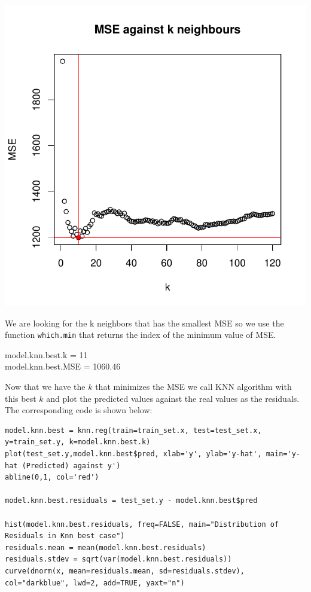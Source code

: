 \documentclass[]{report}
\begin{document}
\begin{center}	
	\includegraphics[width=0.9\linewidth]{Figures/knn_test.pdf}
	\label{fig:knn_train}
\end{center}

We are looking for the k neighbors that has the smallest MSE so we use the function \texttt{which.min} that returns the index of the minimum value of MSE.\\

\begin{center} 
	model.knn.best.k   = 11 \\
	model.knn.best.MSE = 1060.46
\end{center}

Now that we have the $k$ that minimizes the MSE we call KNN algorithm with this best $k$ and plot the predicted values against the real values as the residuals. The corresponding code is shown below:

\begin{lstlisting}
model.knn.best = knn.reg(train=train_set.x, test=test_set.x, y=train_set.y, k=model.knn.best.k)
plot(test_set.y,model.knn.best$pred, xlab='y', ylab='y-hat', main='y-hat (Predicted) against y')
abline(0,1, col='red')

model.knn.best.residuals = test_set.y - model.knn.best$pred

hist(model.knn.best.residuals, freq=FALSE, main="Distribution of Residuals in Knn best case")
residuals.mean = mean(model.knn.best.residuals)
residuals.stdev = sqrt(var(model.knn.best.residuals))
curve(dnorm(x, mean=residuals.mean, sd=residuals.stdev), col="darkblue", lwd=2, add=TRUE, yaxt="n")
\end{lstlisting}
\end{document}
